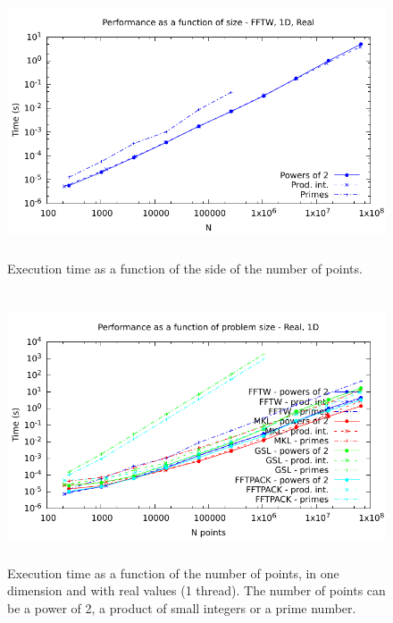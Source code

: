 \documentclass[12pt, a4paper]{article}
\begin{document}
\begin{figure}[H]
\captionsetup{width=0.6\textwidth}
\centering
\includegraphics[height=8cm]{graphs/performance/1d-fftw-r.pdf}
\caption{Execution time as a function of the side of the number of points.}
\label{perf3d}
\end{figure}

\begin{figure}[H]
\captionsetup{width=0.6\textwidth}
\centering
\includegraphics[height=8cm]{graphs/performance1dr/performance1dr.pdf}
\caption{Execution time as a function of the number of points, in one dimension and with real values (1 thread). The number of points can be a power of 2, a product of small integers or a prime number.}
\label{perf1d}
\end{figure}
\end{document}
